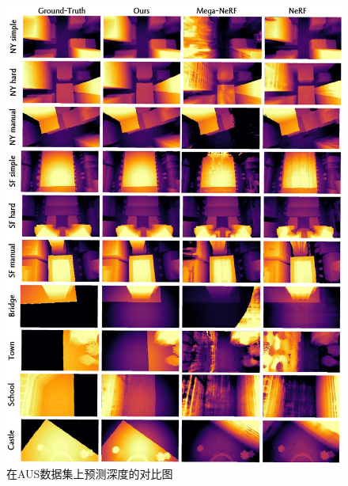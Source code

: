 \begin{figure}[p]
    \centering
    \includegraphics[width=\textwidth]{undergraduate-thesis/images/experiments/depth-prediction qualitative.pdf}
    \caption{在AUS数据集上预测深度的对比图}
    \label{fig:aus-depth-qualitative}
\end{figure}

